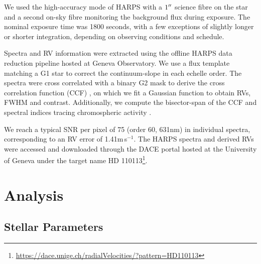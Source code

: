 \documentclass[fleqn,usenatbib]{mnras}
\newcommand{\ms}{m\,s$^{-1}$}
\begin{document}
We used the high-accuracy mode of HARPS with a $1\hbox{$^{\prime\prime}$}$ science fibre on the star and a second on-sky fibre monitoring the background flux during exposure. %
The nominal exposure time was 1800 seconds, with a few exceptions of slightly longer or shorter integration, depending on observing conditions and schedule.

Spectra and RV information were extracted using the 
offline HARPS data reduction pipeline hosted at Geneva Observatory. 
We use a flux template matching a G1 star to correct the continuum-slope in each echelle order. 
The spectra were cross correlated with a binary G2 mask to derive the cross correlation function (CCF) \citep{1996A&AS..119..373B}, on which we fit a Gaussian function to obtain RVs, FWHM and contrast. 
Additionally, we compute the bisector-span \citep{2001A&A...379..279Q} of the CCF and spectral indices tracing chromospheric activity \citep{2011A&A...534A..30G,2009A&A...495..959B}.

We reach a typical SNR per pixel of 75 (order 60, 631nm) in individual spectra, corresponding to an RV error of 1.41\ms{}.
The HARPS spectra and derived RVs were accessed and downloaded through the DACE portal hosted at the University of Geneva \citep{2015ASPC..495....7B} under the target name HD 110113\footnote{\url{https://dace.unige.ch/radialVelocities/?pattern=HD110113}}.

\section{Analysis}\label{sect:analysis}
\subsection{Stellar Parameters}
\end{document}
